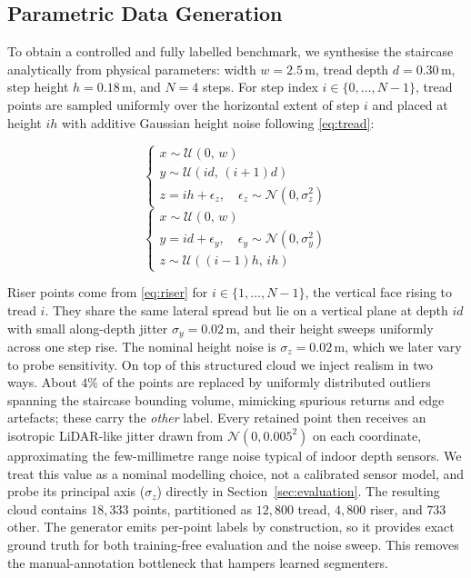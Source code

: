 \subsection{Parametric Data Generation}
To obtain a controlled and fully labelled benchmark, we synthesise the staircase
analytically from physical parameters: width $w=2.5$\,m, tread depth
$d=0.30$\,m, step height $h=0.18$\,m, and $N=4$ steps. For step index
$i\in\{0,\dots,N-1\}$, tread points are sampled uniformly over the horizontal
extent of step $i$ and placed at height $ih$ with additive Gaussian height
noise following \eqref{eq:tread}:

\begin{equation}\label{eq:tread}
\begin{cases}
x \sim \mathcal{U}(0,\,w) \\
y \sim \mathcal{U}(i d,\,(i{+}1) d) \\
z = i h + \epsilon_z,\quad \epsilon_z \sim \mathcal{N}(0,\sigma_z^2)
\end{cases}
\end{equation}
\begin{equation}\label{eq:riser}
\begin{cases}
x \sim \mathcal{U}(0,\,w) \\
y = i d + \epsilon_y,\quad \epsilon_y \sim \mathcal{N}(0,\sigma_y^2) \\
z \sim \mathcal{U}((i{-}1) h,\, i h)
\end{cases}
\end{equation}

Riser points come from \eqref{eq:riser} for $i\in\{1,\dots,N-1\}$, the vertical
face rising to tread $i$. They share the same lateral spread but lie on a
vertical plane at depth $id$ with small along-depth jitter $\sigma_y=0.02$\,m,
and their height sweeps uniformly across one step rise. The nominal height noise
is $\sigma_z=0.02$\,m, which we later vary to probe sensitivity. On top of this
structured cloud we inject realism in two ways. About $4\%$ of the points are
replaced by uniformly distributed outliers spanning the staircase bounding
volume, mimicking spurious returns and edge artefacts; these carry the
\emph{other} label. Every retained point then receives an isotropic LiDAR-like
jitter drawn from $\mathcal{N}(0,0.005^2)$ on each coordinate, approximating the
few-millimetre range noise typical of indoor depth sensors. We treat this value
as a nominal modelling choice, not a calibrated sensor model, and probe its
principal axis ($\sigma_z$) directly in Section~\ref{sec:evaluation}. The
resulting cloud contains $18{,}333$ points, partitioned as $12{,}800$ tread,
$4{,}800$ riser, and $733$ other. The generator emits per-point labels by
construction, so it provides exact ground truth for both training-free
evaluation and the noise sweep. This removes the manual-annotation bottleneck
that hampers learned segmenters.

